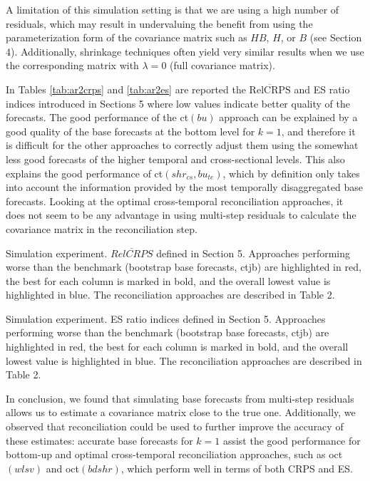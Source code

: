 \documentclass[a4paper,11pt]{article}
\theoremstyle{definition}
\begin{document}
A limitation of this simulation setting is that we are using a high number of residuals, which may result in undervaluing the benefit from using the parameterization form of the covariance matrix such as $HB$, $H$, or $B$ (see Section 4). Additionally, shrinkage techniques often yield very similar results when we use the corresponding matrix with $\lambda = 0$ (full covariance matrix). 

In Tables \ref{tab:ar2crps} and \ref{tab:ar2es} are reported the $\operatorname{\overline{RelCRPS}}$ and ES ratio indices introduced in Sections 5 where low values indicate better quality of the forecasts. The good performance of the ct$(bu)$ approach can be explained by a good quality of the base forecasts at the bottom level for $k=1$, and therefore it is difficult for the other approaches to correctly adjust them using the somewhat less good forecasts of the higher temporal and cross-sectional levels. This also explains the good performance of ct$(shr_{cs}, bu_{te})$, which by definition only takes into account the information provided by the most temporally disaggregated base forecasts.
Looking at the optimal cross-temporal reconciliation approaches, it does not seem to be any advantage in using multi-step residuals to calculate the covariance matrix in the reconciliation step.

\begin{table}[!t]
	\centering
	\begingroup
	\fontsize{9}{11}\selectfont
	
	\endgroup
	\caption{Simulation experiment. $\overline{RelCRPS}$ defined in Section 5. Approaches performing worse than the benchmark (bootstrap base forecasts, ctjb) are highlighted in red, the best for each column is marked in bold, and the overall lowest value is highlighted in blue. The reconciliation approaches are described in Table 2.}
	\label{tab:ar2crps}
\end{table}

\begin{table}[!t]
	\centering
	\begingroup
	\fontsize{9}{11}\selectfont
	
	\endgroup
	\caption{Simulation experiment. ES ratio indices defined in Section 5. Approaches performing worse than the benchmark (bootstrap base forecasts, ctjb) are highlighted in red, the best for each column is marked in bold, and the overall lowest value is highlighted in blue. The reconciliation approaches are described in Table 2.}
	\label{tab:ar2es}
\end{table}

In conclusion, we found that simulating base forecasts from multi-step residuals allows us to estimate a covariance matrix close to the true one. Additionally, we observed that reconciliation could be used to further improve the accuracy of these estimates: accurate base forecasts for $k=1$ assist the good performance for bottom-up and optimal cross-temporal reconciliation approaches, such as oct$(wlsv)$ and oct$(bdshr)$, which perform well in terms of both CRPS and ES.
\end{document}
